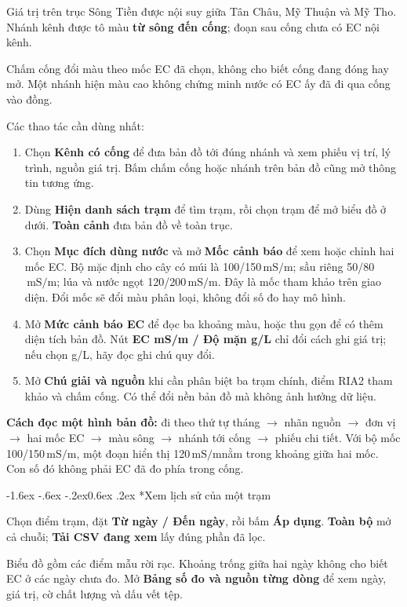 \documentclass[12pt,a4paper,oneside]{report}
\makeatletter
\newcommand{\ms}{\ensuremath{\,\mathrm{mS/m}}}
\renewcommand\subsection{\@startsection{subsection}{2}{\z@}%
  {-1.6ex \@plus -.6ex \@minus -.2ex}{0.6ex \@plus .2ex}%
  {\normalfont\normalsize\bfseries}}
\makeatother
\begin{document}
Giá trị trên trục Sông Tiền được nội suy giữa Tân Châu, Mỹ Thuận và Mỹ Tho. Nhánh kênh được tô màu \textbf{từ sông đến cống}; đoạn sau cống chưa có EC nội kênh.

Chấm cống đổi màu theo mốc EC đã chọn, không cho biết cống đang đóng hay mở. Một nhánh hiện màu cao không chứng minh nước có EC ấy đã đi qua cống vào đồng.

Các thao tác cần dùng nhất:
\begin{enumerate}
  \item Chọn \textbf{Kênh có cống} để đưa bản đồ tới đúng nhánh và xem phiếu vị trí, lý trình, nguồn giá trị. Bấm chấm cống hoặc nhánh trên bản đồ cũng mở thông tin tương ứng.
  \item Dùng \textbf{Hiện danh sách trạm} để tìm trạm, rồi chọn trạm để mở biểu đồ ở dưới. \textbf{Toàn cảnh} đưa bản đồ về toàn trục.
  \item Chọn \textbf{Mục đích dùng nước} và mở \textbf{Mốc cảnh báo} để xem hoặc chỉnh hai mốc EC. Bộ mặc định cho cây có múi là 100/150\ms; sầu riêng 50/80\ms; lúa và nước ngọt 120/200\ms. Đây là mốc tham khảo trên giao diện. Đổi mốc sẽ đổi màu phân loại, không đổi số đo hay mô hình.
  \item Mở \textbf{Mức cảnh báo EC} để đọc ba khoảng màu, hoặc thu gọn để có thêm diện tích bản đồ. Nút \textbf{EC mS/m / Độ mặn g/L} chỉ đổi cách ghi giá trị; nếu chọn g/L, hãy đọc ghi chú quy đổi.
  \item Mở \textbf{Chú giải và nguồn} khi cần phân biệt ba trạm chính, điểm RIA2 tham khảo và chấm cống. Có thể đổi nền bản đồ mà không ảnh hưởng dữ liệu.
\end{enumerate}

\textbf{Cách đọc một hình bản đồ:} đi theo thứ tự tháng $\rightarrow$ nhãn nguồn $\rightarrow$ đơn vị $\rightarrow$ hai mốc EC $\rightarrow$ màu sông $\rightarrow$ nhánh tới cống $\rightarrow$ phiếu chi tiết. Với bộ mốc 100/150\ms, một đoạn hiển thị 120\ms nằm trong khoảng giữa hai mốc. Con số đó không phải EC đã đo phía trong cống.

\subsection*{Xem lịch sử của một trạm}

Chọn điểm trạm, đặt \textbf{Từ ngày / Đến ngày}, rồi bấm \textbf{Áp dụng}. \textbf{Toàn bộ} mở cả chuỗi; \textbf{Tải CSV đang xem} lấy đúng phần đã lọc.

Biểu đồ gồm các điểm mẫu rời rạc. Khoảng trống giữa hai ngày không cho biết EC ở các ngày chưa đo. Mở \textbf{Bảng số đo và nguồn từng dòng} để xem ngày, giá trị, cờ chất lượng và dấu vết tệp.
\end{document}

